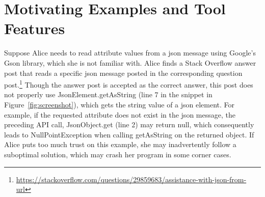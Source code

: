 \section{Motivating Examples and Tool Features}
\label{sec:motivation}
%

Suppose Alice needs to read attribute values from a json message using Google's Gson library, which she is not familiar with. Alice finds a Stack Overflow answer post that reads a specific json message posted in the corresponding question post.\footnote{\url{https://stackoverflow.com/questions/29859683/assistance-with-json-from-url}} Though the answer post is accepted as the correct answer, this post does not properly use {\ttt JsonElement.getAsString} (line 7 in the snippet in Figure~\ref{fig:screenshot}), which gets the string value of a json element. For example, if the requested attribute does not exist in the json message, the preceding API call, {\ttt JsonObject.get} (line 2) may return {\ttt null}, which consequently leads to {\ttt NullPointException} when calling {\ttt getAsString} on the returned object. If Alice puts too much trust on this example, she may inadvertently follow a suboptimal solution, which may crash her program in some corner cases. 

